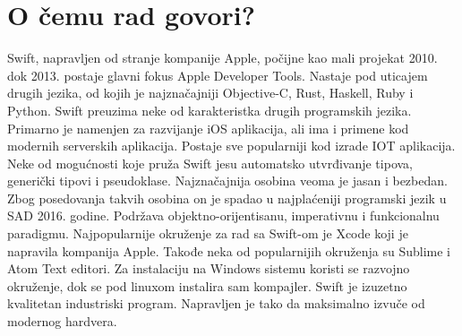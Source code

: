 \documentclass[a4paper]{report}
\begin{document}
\section{O čemu rad govori?}
	Swift, napravljen od stranje kompanije Apple, počijne kao mali projekat 2010. dok 2013. postaje glavni fokus Apple Developer Tools.
	Nastaje pod uticajem drugih jezika, od kojih je najznačajniji Objective-C, Rust, Haskell, Ruby i Python. Swift preuzima neke od karakteristka drugih programskih jezika.
	Primarno je namenjen za razvijanje iOS aplikacija, ali ima i primene kod modernih serverskih aplikacija. Postaje sve popularniji kod izrade IOT aplikacija. Neke od mogućnosti
	koje pruža Swift jesu automatsko utvrđivanje tipova, generički tipovi i pseudoklase. Najznačajnija osobina veoma je jasan i bezbedan. Zbog posedovanja takvih osobina on je spadao
	u najplaćeniji programski jezik u SAD 2016. godine.	Podržava objektno-orijentisanu, imperativnu i funkcionalnu paradigmu. Najpopularnije okruženje za rad sa Swift-om je Xcode koji je napravila kompanija 
	Apple. Takođe neka od popularnijih okruženja su Sublime i Atom Text editori. Za instalaciju na Windows sistemu koristi se razvojno okruženje, dok se pod linuxom instalira sam kompajler.
	Swift je izuzetno kvalitetan industriski program. Napravljen je tako da maksimalno izvuče od modernog hardvera.
\end{document}
